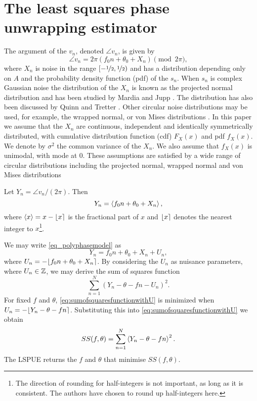\section{The least squares phase unwrapping estimator}
The argument of the $v_n$, denoted $\angle{v_n}$, is given by
\[
\angle{v_n} = 2\pi\left( f_0 n + \theta_0 + X_n \right) \pmod{2\pi},
\]
where $X_n$ is noise in the range $[-\nicefrac{1}{2}, \nicefrac{1}{2})$ and 
has a distribution depending only on $A$ and the probability density function
(pdf) of the $s_n$.  When $s_n$ is complex Gaussian noise the distribution of
the $X_n$ is known as the projected normal distribution and has been studied
by Mardia and Jupp \cite[p. 46]{Mardia_directional_statistics}.  The
distribution has also been discussed by Quinn \cite{Quinn2007} and Tretter
\cite{Tretter1985}.  Other circular noise distributions may be used, for
example, the wrapped normal, or von Mises distributions \cite{Fisher1993,
  Mardia_directional_statistics}.  In this paper we assume that the $X_n$ are
continuous, independent and identically symmetrically distributed, with
cumulative distribution function (cdf) $F_X\left( x\right) $ and pdf $f_X
\left( x\right)$.  We denote by $\sigma^{2}$ the common variance of the $X_n$.
We also assume that $f_X \left( x\right) $ is unimodal, with mode at
$0$. %
These assumptions are satisfied by a wide range of circular distributions
including the projected normal, wrapped normal and von Mises distributions
\cite{Fisher1993, Mardia_directional_statistics}

Let $Y_n = \angle{v_n}/ \left(2\pi\right)$.  Then
\begin{equation} \label{eq_polyphasemodel}
Y_n = \fracpart{ f_0 n + \theta_0 + X_n },
\end{equation}
where $\left< x \right> = x - {\left\lfloor x \right\rceil}$ is the fractional part of $x$ and ${\left\lfloor x \right\rceil}$
denotes the nearest integer to $x$\footnote{The direction of rounding for
  half-integers is not important, as long as it is consistent. The authors
  have chosen to round up half-integers here.}.

We may write \eqref{eq_polyphasemodel} as
\begin{equation} \label{eq:eq_polyphasemodel}
Y_n = f_0 n + \theta_0 + X_n + U_n,
\end{equation}
where $U_n = -{\left\lfloor f_0 n + \theta_0 + X_n \right\rceil}$.  By considering the $U_n$ as
nuisance parameters, where $U_n \in {\mathbb Z}$, we may derive the sum of squares
function
\begin{equation} \label{eq:sumofsquaresfunctionwithU}
\sum_{n=1}^{N}\left(  Y_{n} - \theta - fn - U_{n}\right)^{2}.
\end{equation}
For fixed $f$ and $\theta$, \eqref{eq:sumofsquaresfunctionwithU} is minimized
when $U_{n} = -{\left\lfloor Y_{n} - \theta - fn \right\rceil}$.  Substituting this into
\eqref{eq:sumofsquaresfunctionwithU} we obtain
\begin{equation} \label{eq:sumofsquaresfunction}
SS(f, \theta) = \sum_{n=1}^{N}\fracpart{  Y_{n} - \theta - fn }^{2}.
\end{equation}
The LSPUE returns the $f$ and $\theta$ that minimise $SS(f, \theta)$.


